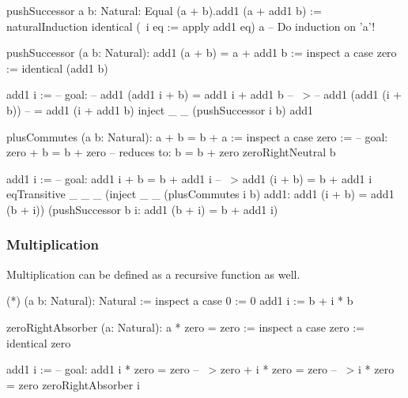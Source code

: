 \begin{alba}
    pushSuccessor {a b: Natural}: Equal (a + b).add1  (a + add1 b) :=
        naturalInduction
            identical
            (\ {i} eq := apply add1 eq)
            {a}         -- Do induction on 'a'!

    pushSuccessor (a b: Natural): add1 (a + b) = a + add1 b :=
        inspect a case
            zero :=
                identical (add1 b)

            add1 i :=
                -- goal:
                --   add1 (add1 i + b) = add1 i + add1 b
                -- ~>
                --   add1 (add1 (i + b))
                --   = add1 (i + add1 b)
                inject _ _
                    (pushSuccessor i b)
                    add1
\end{alba}



\begin{alba}
    plusCommutes (a b: Natural): a + b = b + a :=
        inspect a case
            zero :=
                -- goal: zero + b = b + zero
                -- reduces to: b = b + zero
                zeroRightNeutral b

            add1 i :=
                -- goal: add1 i + b = b + add1 i
                -- ~>    add1 (i + b) = b + add1 i
                eqTransitive
                    _ _ _
                    (inject _ _ (plusCommutes i b) add1:
                        add1 (i + b) = add1 (b + i))
                    (pushSuccessor b i:
                        add1 (b + i) =  b + add1 i)
\end{alba}







\subsubsection{Multiplication}



Multiplication can be defined as a recursive function as well.

\begin{alba}
  (*) (a b: Natural): Natural :=
    inspect a case
        0 :=
            0
        add1 i :=
            b + i * b
\end{alba}

\begin{alba}
    zeroRightAbsorber (a: Natural): a * zero = zero :=
        inspect a case
            zero :=
                identical zero

            add1 i :=
                -- goal: add1 i * zero = zero
                -- ~>    zero + i * zero = zero
                -- ~>    i * zero = zero
                zeroRightAbsorber i
\end{alba}

